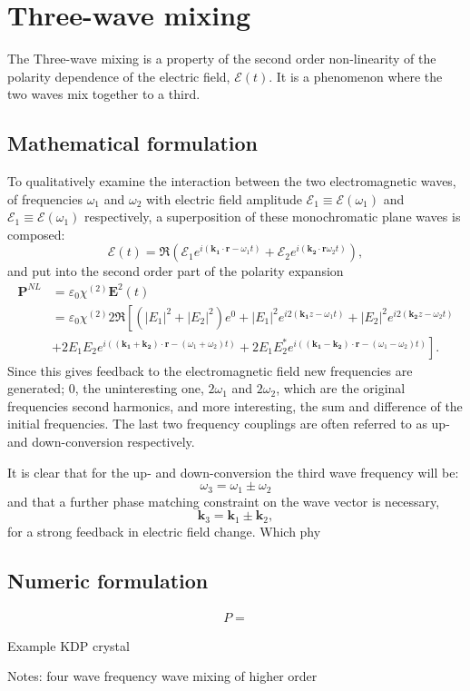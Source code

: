 \chapter{Three-wave mixing}
\label{cha:mixing}


The Three-wave mixing is a property of the second order non-linearity of the polarity dependence of the electric field, $\mathcal{E}(t)$. 
It is a phenomenon where the two waves mix together to a third. 



\section{Mathematical formulation}
\label{sec:mixing-math}

To qualitatively examine the interaction between the two electromagnetic waves, of frequencies $\omega_1$ and $\omega_2$ with electric field amplitude $\mathcal{E}_1  \equiv \mathcal{E}(\omega_1)$ and $\mathcal{E}_1  \equiv \mathcal{E}(\omega_1)$ respectively, a superposition of these monochromatic plane waves is composed: 
\[
\mathbf{\mathcal{E}}(t) = \Re (\mathcal{E}_1e^{i(\mathbf{k_1} \cdot \mathbf{r} - \omega_1 t)}+\mathcal{E}_2e^{i(\mathbf{k_2} \cdot \mathbf{r} \omega_2 t)}),
\]
and put into the second order part of the polarity expansion \cite{saleh}
\begin{align*}
     \mathbf{P}^{NL} & = \varepsilon_0 \chi^{(2)} \mathbf{E}^2(t) \\
&= \varepsilon_0 \chi^{(2)} 2 \Re \left[
\left(|E_1|^2+|E_2|^2\right)e^{0} + |E_1|^2e^{i2(\mathbf{k_1} z - \omega_1t)}+|E_2|^2e^{i2(\mathbf{k_2} z - \omega_2t)} \right.\\
& \left. +2E_1E_2e^{i((\mathbf{k_1} + \mathbf{k_2}) \cdot \mathbf{r} - (\omega_1+\omega_2)t)}  +2E_1E_2^*e^{i((\mathbf{k_1} - \mathbf{k_2}) \cdot \mathbf{r} - (\omega_1-\omega_2)t)} \right].
\end{align*}
Since this gives feedback to the electromagnetic field new frequencies are generated; $0$, the uninteresting one, $2\omega_1$ and $2\omega_2$, which are the original frequencies second harmonics, and more interesting, the sum and difference of the initial frequencies. The last two frequency couplings are often referred to as up- and down-conversion respectively.

It is clear that for the up- and down-conversion the third wave frequency will be:
\[
\omega_3 = \omega_1 \pm \omega_2
\]
and that a further phase matching constraint on the wave vector is necessary,
\[
\mathbf{k}_3 = \mathbf{k}_1 \pm \mathbf{k}_2,
\]
for a strong feedback in electric field change. Which phy





\section{Numeric formulation}
\label{sec:mixing-numeric}

\begin{align}
P = 
\end{align}


Example KDP crystal

Notes:
four wave frequency wave mixing of higher order

